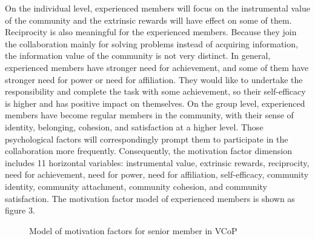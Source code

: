 \documentclass{elsarticle}
\begin{document}
   On the individual level, experienced members will focus on the
   instrumental value of the community and the extrinsic rewards will
   have effect on some of them. Reciprocity is also meaningful for the
   experienced members. Because they join the collaboration mainly for
   solving problems instead of acquiring information, the information
   value of the community is not very distinct. In general,
   experienced members have stronger need for achievement, and some of
   them have stronger need for power or need for affiliation. They
   would like to undertake the responsibility and complete the task
   with some achievement, so their self-efficacy is higher and has
   positive impact on themselves. On the group level, experienced
   members have become regular members in the community, with their
   sense of identity, belonging, cohesion, and satisfaction at a
   higher level. Those psychological factors will correspondingly
   prompt them to participate in the collaboration more
   frequently. Consequently, the motivation factor dimension includes
   11 horizontal variables: instrumental value, extrinsic rewards,
   reciprocity, need for achievement, need for power, need for
   affiliation, self-efficacy, community identity, community
   attachment, community cohesion, and community satisfaction. The
   motivation factor model of experienced members is shown as figure
   3.
\begin{figure}[htpb]
  \centering
  \label{fig:senior member}
  \caption{Model of motivation factors for senior
    member in VCoP}
\end{figure}
\end{document}
